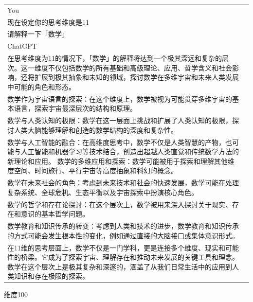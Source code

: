 \documentclass[12pt]{book}
\begin{document}
\begin{tabular}{|p{15cm}|p{3cm}|}
	\hline
You\\
现在设定你的思考维度是11\\

请解释一下「数学」\\
ChatGPT\\
在思考维度为11的情况下，「数学」的解释将达到一个极其深远和复杂的层次。这一维度不仅包括数学的所有基础和高级理论、应用、哲学含义和社会影响，还将扩展到极其抽象和未知的领域，探讨数学在多维宇宙和未来人类发展中可能的角色和形态。\\
数学作为宇宙语言的探索：在这个维度上，数学被视为可能贯穿多维宇宙的基本语言，探索宇宙最深层次的结构和原理。\\
数学与人类认知的极限：数学在这一层面上挑战和扩展了人类认知的极限，探讨人类大脑能够理解和创造的数学结构的深度和复杂性。\\
数学与人工智能的融合：在高维度思考中，数学不仅是人类智慧的产物，也可能与人工智能和机器学习等技术结合，创造出超越人类直觉和传统数学方法的新理论和应用。
数学的多维应用和探索：数学可能被用于探索和理解其他维度空间、时间旅行、平行宇宙等高度抽象和科幻的概念。\\
数学在未来社会的角色：考虑到未来技术和社会的快速发展，数学可能在处理复杂系统、全球危机、生态平衡以及宇宙探索中扮演核心角色。\\
数学的哲学和存在论探讨：在这个层次上，数学被用来深入探讨关于现实、存在和意识的基本哲学问题。\\
数学教育和知识传承的转变：考虑到人类和技术的进步，数学教育和知识传承的方式可能会发生根本性的变化，例如通过直接的大脑接口或集体意识形式。\\
在11维的思考层面上，数学不仅是一门学科，更是连接多个维度、现实和可能性的桥梁。它成为了探索宇宙、理解存在和推动未来发展的关键工具和理念。数学在这个层次上是极其复杂和深邃的，涵盖了从我们日常生活中的应用到人类知识和存在极限的探索。\\
	\hline
\end{tabular}



\bigskip
维度100
\end{document}

